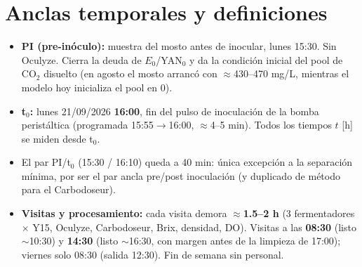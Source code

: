 \documentclass[10pt,landscape]{article}
\begin{document}
\section{Anclas temporales y definiciones}
\begin{itemize}\setlength{\itemsep}{1pt}
\item \textbf{PI (pre-inóculo):} muestra del mosto antes de inocular, lunes 15:30. Sin Oculyze. Cierra la deuda de $E_0$/YAN$_0$ y da la condición inicial del pool de CO$_2$ disuelto (en agosto el mosto arrancó con $\approx$430--470 mg/L, mientras el modelo hoy inicializa el pool en 0).
\item \textbf{t$_0$:} lunes 21/09/2026 \textbf{16:00}, fin del pulso de inoculación de la bomba peristáltica (programada 15:55$\rightarrow$16:00, $\approx$4--5 min). Todos los tiempos $t$ [h] se miden desde t$_0$.
\item El par PI/t$_0$ (15:30 / 16:10) queda a 40 min: única excepción a la separación mínima, por ser el par ancla pre/post inoculación (y duplicado de método para el Carbodoseur).
\item \textbf{Visitas y procesamiento:} cada visita demora \textbf{$\approx$1.5--2 h} (3 fermentadores $\times$ Y15, Oculyze, Carbodoseur, Brix, densidad, DO). Visitas a las \textbf{08:30} (listo $\sim$10:30) y \textbf{14:30} (listo $\sim$16:30, con margen antes de la limpieza de 17:00); viernes solo 08:30 (salida 12:30). Fin de semana sin personal.
\end{itemize}
\end{document}
